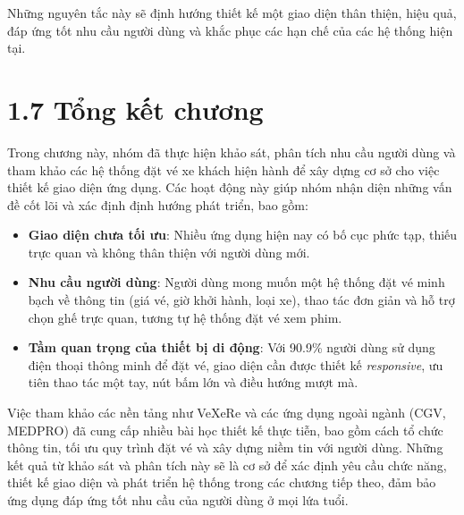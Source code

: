 Những nguyên tắc này sẽ định hướng thiết kế một giao diện thân thiện, hiệu quả, đáp ứng tốt nhu cầu người dùng và khắc phục các hạn chế của các hệ thống hiện tại.

\section*{1.7 Tổng kết chương}
Trong chương này, nhóm đã thực hiện khảo sát, phân tích nhu cầu người dùng và tham khảo các hệ thống đặt vé xe khách hiện hành để xây dựng cơ sở cho việc thiết kế giao diện ứng dụng. Các hoạt động này giúp nhóm nhận diện những vấn đề cốt lõi và xác định định hướng phát triển, bao gồm:

\begin{itemize}
    \item \textbf{Giao diện chưa tối ưu}: Nhiều ứng dụng hiện nay có bố cục phức tạp, thiếu trực quan và không thân thiện với người dùng mới.
    \item \textbf{Nhu cầu người dùng}: Người dùng mong muốn một hệ thống đặt vé minh bạch về thông tin (giá vé, giờ khởi hành, loại xe), thao tác đơn giản và hỗ trợ chọn ghế trực quan, tương tự hệ thống đặt vé xem phim.
    \item \textbf{Tầm quan trọng của thiết bị di động}: Với 90.9\% người dùng sử dụng điện thoại thông minh để đặt vé, giao diện cần được thiết kế \textit{responsive}, ưu tiên thao tác một tay, nút bấm lớn và điều hướng mượt mà.
\end{itemize}

Việc tham khảo các nền tảng như VeXeRe và các ứng dụng ngoài ngành (CGV, MEDPRO) đã cung cấp nhiều bài học thiết kế thực tiễn, bao gồm cách tổ chức thông tin, tối ưu quy trình đặt vé và xây dựng niềm tin với người dùng. Những kết quả từ khảo sát và phân tích này sẽ là cơ sở để xác định yêu cầu chức năng, thiết kế giao diện và phát triển hệ thống trong các chương tiếp theo, đảm bảo ứng dụng đáp ứng tốt nhu cầu của người dùng ở mọi lứa tuổi.